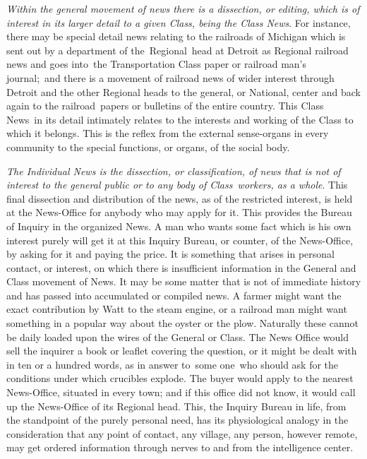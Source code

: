 \documentclass[openany,nobib]{tufte-book}
\begin{document}
\vspace{0.05in}

\emph{Within the general movement of news there is a dissection, or
editing, which is of interest in its larger detail to a given Class,
being the Class News}. For instance, there may be special detail news
relating to the railroads of Michigan which is sent out by a department
of the~Regional~head at Detroit as Regional railroad news and goes
into~the Transportation Class paper or railroad man's journal;~and there
is a movement of railroad news of wider interest through Detroit and the
other Regional heads to the general, or National, center and back again
to the railroad~papers or bulletins of the entire country. This Class
News~in its detail intimately relates to the interests and working of
the Class to which it belongs. This is the reflex from the external
sense-organs in every community to the special functions, or organs, of
the social body.~

\vspace{0.05in}

\emph{The Individual News is the dissection, or classification, of news
that is not of interest to the general public or to any body of
Class~workers, as a whole}. This final dissection and distribution of
the news, as of the restricted interest, is held at the News-Office for
anybody who may apply for it. This provides the Bureau of Inquiry in the
organized News. A man who wants some fact which is his own interest
purely will get it at this Inquiry Bureau, or counter, of the
News-Office, by asking for it and paying the price. It is something that
arises in personal contact, or interest, on which there is insufficient
information in the General and Class movement of News. It may be some
matter that is not of immediate history and has passed into accumulated
or compiled news. A farmer might want the exact contribution by Watt to
the steam engine, or a railroad man might want something in a popular
way about the oyster or the plow. Naturally these cannot be daily loaded
upon the wires of the General or Class. The News Office would sell the
inquirer a book or leaflet covering the question, or it might be dealt
with in ten or a hundred words, as in answer to~some one~who should ask
for the conditions under which crucibles explode. The buyer would apply
to the nearest News-Office, situated in every town; and if this office
did not know, it would call up the News-Office of its Regional head.
This, the Inquiry Bureau in life, from the standpoint of the purely
personal need, has its physiological analogy in the consideration that
any point of contact, any village, any person, however remote, may get
ordered information through nerves to and from the intelligence center.~
\end{document}
